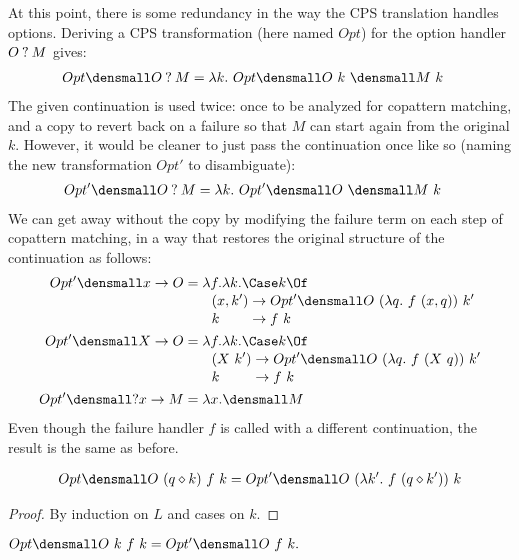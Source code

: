 \documentclass[sigplan,screen]{acmart}
\begin{document}
At this point, there is some redundancy in the way the CPS translation handles
options.  Deriving a CPS transformation (here named $Opt$) for the option
handler $O \mathbin{?} M$ gives:
\begin{align*}
  Opt\den{O \ask M} &= \lambda k.~ Opt\den{O} ~ k ~ \den{M} ~ k
\end{align*}
The given continuation is used twice: once to be analyzed for copattern
matching, and a copy to revert back on a failure so that $M$ can start again
from the original $k$.  However, it would be cleaner to just pass the
continuation once like so (naming the new transformation $Opt'$ to
disambiguate):
\begin{align*}
  Opt'\den{O \ask M} &= \lambda k.~ Opt'\den{O} ~ \den{M} ~ k
\end{align*}
We can get away without the copy by modifying the failure term on each step of
copattern matching, in a way that restores the original structure of the
continuation as follows:
\begin{align*}
  Opt'\den{x \to O}
  &=
  \lambda f. \lambda k.
  \Case k \Of
  \\[-0.5ex]
  &\qquad
  \begin{alignedat}[t]{2}
    &(x, k') &&\to Opt'\den{O} ~ (\lambda q.~ f ~ (x, q)) ~ k'
    \\[-0.5ex]
    &k &&\to f ~ k
  \end{alignedat}
  \\
  Opt'\den{X \to O}
  &=
  \lambda f. \lambda k.
  \Case k \Of
  \\[-0.5ex]
  &\qquad
  \begin{alignedat}[t]{2}
    &(X ~ k') &&\to Opt'\den{O} ~ (\lambda q.~ f ~ (X ~ q)) ~ k'
    \\[-0.5ex]
    &k &&\to f ~ k
  \end{alignedat}
  \\
  Opt'\den{\ask x \to M}
  &=
  \lambda x. \den{M}
\end{align*}
Even though the failure handler $f$ is called with a different continuation, the
result is the same as before.
\begin{lemma}
  \begin{align*}
    Opt\den{O} ~ (q \compq k) ~ f ~ k
    =
    Opt'\den{O} ~ (\lambda k'.~ f ~ (q \compq k')) ~ k
  \end{align*}
\end{lemma}
\begin{proof}
  By induction on $L$ and cases on $k$.
\end{proof}
\begin{corollary}
  \begin{math}
    Opt\den{O} ~ k ~ f ~ k
    =
    Opt'\den{O} ~ f ~ k
    .
  \end{math}
\end{corollary}
\end{document}
